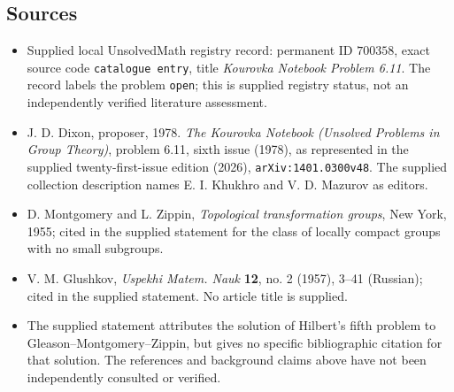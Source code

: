 \documentclass[11pt]{article}
\begin{document}
\subsection{Sources}
\begin{itemize}
\item Supplied local UnsolvedMath registry record: permanent ID \(700358\), exact source code \texttt{catalogue entry}, title \emph{Kourovka Notebook Problem 6.11}. The record labels the problem \texttt{open}; this is supplied registry status, not an independently verified literature assessment.
\item J. D. Dixon, proposer, 1978. \emph{The Kourovka Notebook (Unsolved Problems in Group Theory)}, problem 6.11, sixth issue (1978), as represented in the supplied twenty-first-issue edition (2026), \texttt{arXiv:1401.0300v48}. The supplied collection description names E. I. Khukhro and V. D. Mazurov as editors.
\item D. Montgomery and L. Zippin, \emph{Topological transformation groups}, New York, 1955; cited in the supplied statement for the class of locally compact groups with no small subgroups.
\item V. M. Glushkov, \emph{Uspekhi Matem. Nauk} \textbf{12}, no. 2 (1957), 3--41 (Russian); cited in the supplied statement. No article title is supplied.
\item The supplied statement attributes the solution of Hilbert's fifth problem to Gleason--Montgomery--Zippin, but gives no specific bibliographic citation for that solution. The references and background claims above have not been independently consulted or verified.
\end{itemize}
\end{document}
